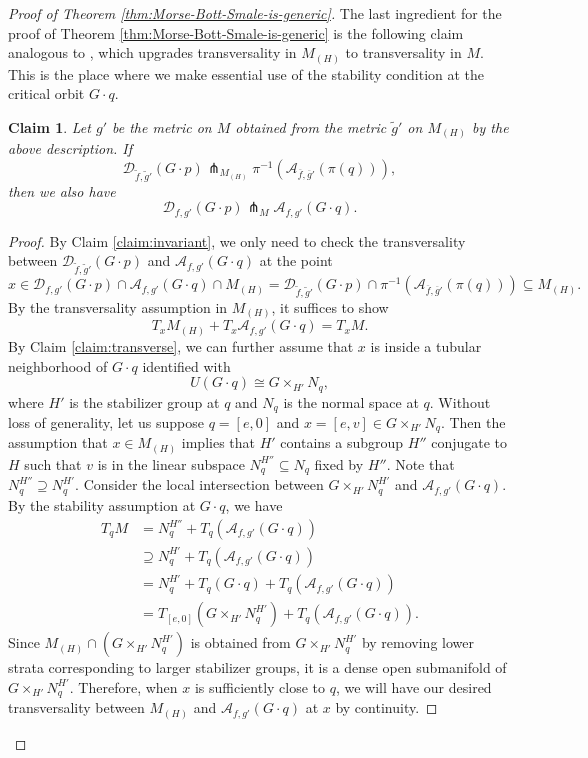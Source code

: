 \documentclass[11pt]{amsart}
\newtheorem{claim}[theorem]{Claim}
\theoremstyle{definition}
\numberwithin{equation}{subsection}
\newcommand{\des}{\mathscr{D}}
\newcommand{\asc}{\mathscr{A}}
\begin{document}
\begin{proof}[Proof of Theorem \ref{thm:Morse-Bott-Smale-is-generic}]
The last ingredient for the proof of Theorem \ref{thm:Morse-Bott-Smale-is-generic} is the following claim analogous to \cite[Lemma 7.5]{bao2024morse}, which upgrades transversality in $M_{(H)}$ to transversality in $M$. This is the place where we make essential use of the stability condition at the critical orbit $G\cdot q$.

\begin{claim}\label{claim:extendtransversality}
  Let $g'$ be the metric on $M$ obtained from the metric $\tilde{g}'$ on $M_{(H)}$ by the above description. If \[\des_{\tilde{f},\tilde{g}'}(G\cdot p)\pitchfork_{M_{(H)}}\pi^{-1}(\asc_{\overline{f},\overline{g}'}(\pi(q))),\]
    then we also have \[\des_{f,g'}(G\cdot p)\pitchfork_{M}\asc_{f,g'}(G\cdot q).\]
\end{claim}
\begin{proof}
By Claim \ref{claim:invariant}, we only need to check the transversality between $\des_{\tilde{f},\tilde{g}'}(G\cdot p)$ and $\asc_{f,g'}(G\cdot q)$ at the point \[x\in \des_{f,g'}(G\cdot p)\cap\asc_{f,g'}(G\cdot q)\cap M_{(H)}=\des_{\tilde{f},\tilde{g}'}(G\cdot p)\cap\pi^{-1}(\asc_{\overline{f},\overline{g}'}(\pi(q)))\subseteq M_{(H)}.\]  
 By the transversality assumption in $M_{(H)}$, it suffices to show 
\[T_xM_{(H)}+T_x\asc_{f,g'}(G\cdot q)=T_xM.\]By Claim \ref{claim:transverse}, we can further assume that $x$ is inside a tubular neighborhood of $G\cdot q$ identified with 
\[U(G\cdot q)\cong G\times_{H'} N_q,\]where $H'$ is the stabilizer group at $q$ and $N_q$ is the normal space at $q$. Without loss of generality, let us suppose $q=[e,0]$ and $x=[e,v]\in G\times _{H'}N_q$. Then the assumption that $x\in M_{(H)}$ implies that $H'$ contains a subgroup $H''$ conjugate to $H$ such that $v$ is in the linear subspace $N_q^{H''}\subseteq N_q$ fixed by $H''$. Note that $N_q^{H''}\supseteq N_q^{H'}$. Consider the local intersection between $G\times _{H'} N_q^{H'}$ and $\asc_{f,g'}(G\cdot q)$. By the stability assumption at $G\cdot q$, we have 
\begin{align*}
    T_qM&=N_q^{H''}+T_q(\asc_{f,g'}(G\cdot q))\\
    &\supseteq N_q^{H'}+T_q(\asc_{f,g'}(G\cdot q))\\
    &=N_q^{H'}+T_q(G\cdot q)+T_q(\asc_{f,g'}(G\cdot q))\\
    &=T_{[e,0]}(G\times _{H'} N_q^{H'})+T_q(\asc_{f,g'}(G\cdot q)).
\end{align*}
Since $M_{(H)}\cap (G\times_{H'} N^{H'}_{q})$ is obtained from $G\times_{H'} N^{H'}_{q}$ by removing lower strata corresponding to larger stabilizer groups, it is a dense open submanifold of $G\times_{H'} N^{H'}_{q}$. Therefore, when $x$ is sufficiently close to $q$, we will have our desired transversality between $M_{(H)}$ and $\asc_{f,g'}(G\cdot q)$ at $x$ by continuity.


\end{proof}
\end{proof}
\end{document}

